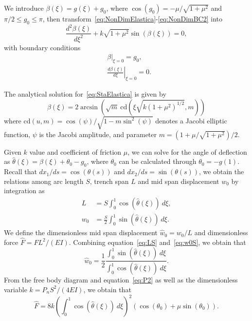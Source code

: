 We introduce $\beta(\xi) = g(\xi) + g_0$, where $\cos(g_0) = -\mu/\sqrt{1+\mu^2}$ and $\pi/2 \leq g_0 \leq \pi$, then transform~\eqref{eq:NonDimElastica}-\eqref{eq:NonDimBC2} into
\begin{equation}
    \label{eq:StaElastica}
    \frac{d^2 \beta(\xi)}{d \xi^2} + k \sqrt{1+\mu^2} \sin(\beta(\xi)) = 0,
\end{equation}
with boundary conditions
\begin{align}
    \label{eq:StaBC1}
    & \left. \beta \right|_{\xi = 0} = g_0, \\
    \label{eq:StaBC2}
    & \left. \frac{d \beta (\xi)}{d\xi} \right|_{\xi = 0} = 0.
\end{align}

The analytical solution for~\eqref{eq:StaElastica} is given by
\begin{equation}
    \label{eq:StaElasticaSol}
    \beta(\xi) =  2 \arcsin \left(\sqrt{m} \ \text{cd}\left(\xi \sqrt{k(1+\mu^2)^{1/2}}, m \right)\right)
\end{equation}
where $\text{cd}(u, m) = \cos(\psi)/\sqrt{1 - m \sin^2(\psi)}$ denotes a Jacobi elliptic function, $\psi$ is the Jacobi amplitude, and parameter $m =\left(1 + \mu/\sqrt{1 + \mu^2}\right)/2 $.

Given $k$ value and coefficient of friction $\mu$, we can solve for the angle of deflection as $\hat{\theta}(\xi) = \beta(\xi) + \theta_0 - g_0 $, where $\theta_0$ can be calculated through $\theta_0 = - g(1)$.
Recall that $dx_1/ds = \cos(\theta(s))$ and $dx_2/ds = \sin(\theta(s))$, we obtain the relations among arc length $S$, trench span $L$ and mid span displacement $w_0$ by integration as
\begin{align}
    \label{eq:LS}
    L &= S \int_0^1 \cos(\hat{\theta}(\xi))\  d\xi , \\
    \label{eq:w0S}
    w_0 &= \frac{S}{2} \int_0^1 \sin(\hat{\theta}(\xi))\  d\xi.
\end{align}
We define the dimensionless mid span displacement $\hat{w}_0 = w_0/L$ and dimensionless force $\hat{F} = FL^2/(EI)$. Combining equation~\eqref{eq:LS} and~\eqref{eq:w0S}, we obtain that
\begin{equation}
    \label{eq:w0L}
    \hat{w}_0 =  \frac{1}{2}  \frac{\int_0^1 \sin(\hat{\theta}(\xi))\  d\xi}{\int_0^1 \cos(\hat{\theta}(\xi))\  d\xi} .
\end{equation}
From the free body diagram and equation~\eqref{eq:P2} as well as the dimensionless variable $k = P_n S^2/(4 E I)$, we obtain that
\begin{equation}
    \label{eq:Fhat}
    \hat{F} =  8k\left(\int _0^1 \cos(\hat{\theta}(\xi))\  d\xi \right)^2
    \left(\cos (\theta _0 ) + \mu \sin(\theta _0) \right).
\end{equation}


